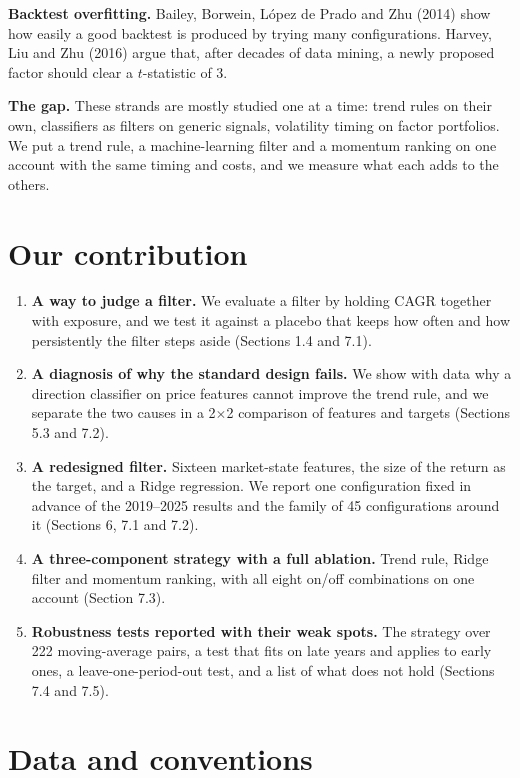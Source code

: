 \documentclass[11pt]{article}
\providecommand{\tightlist}{\setlength{\itemsep}{2pt}\setlength{\parskip}{0pt}}
\begin{document}
\textbf{Backtest overfitting.} Bailey, Borwein, López de Prado and Zhu (2014) show how easily a good backtest is produced by trying many configurations. Harvey, Liu and Zhu (2016) argue that, after decades of data mining, a newly proposed factor should clear a \(t\)-statistic of 3.

\textbf{The gap.} These strands are mostly studied one at a time: trend rules on their own, classifiers as filters on generic signals, volatility timing on factor portfolios. We put a trend rule, a machine-learning filter and a momentum ranking on one account with the same timing and costs, and we measure what each adds to the others.

\section{Our contribution}

\begin{enumerate}
\def\labelenumi{\arabic{enumi}.}
\tightlist
\item
  \textbf{A way to judge a filter.} We evaluate a filter by holding CAGR together with exposure, and we test it against a placebo that keeps how often and how persistently the filter steps aside (Sections 1.4 and 7.1).
\item
  \textbf{A diagnosis of why the standard design fails.} We show with data why a direction classifier on price features cannot improve the trend rule, and we separate the two causes in a 2$\times$2 comparison of features and targets (Sections 5.3 and 7.2).
\item
  \textbf{A redesigned filter.} Sixteen market-state features, the size of the return as the target, and a Ridge regression. We report one configuration fixed in advance of the 2019--2025 results and the family of 45 configurations around it (Sections 6, 7.1 and 7.2).
\item
  \textbf{A three-component strategy with a full ablation.} Trend rule, Ridge filter and momentum ranking, with all eight on/off combinations on one account (Section 7.3).
\item
  \textbf{Robustness tests reported with their weak spots.} The strategy over 222 moving-average pairs, a test that fits on late years and applies to early ones, a leave-one-period-out test, and a list of what does not hold (Sections 7.4 and 7.5).
\end{enumerate}

\section{Data and conventions}
\end{document}
